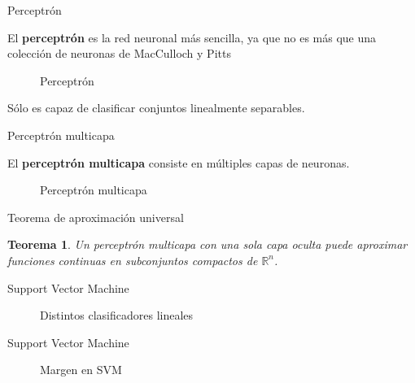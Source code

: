\documentclass[hyperref={unicode}]{beamer}
\newtheorem{teo}{\textbf{\color{ExecusharesBlue}Teorema}}
\begin{document}
\begin{frame}{Perceptrón}

El \textbf{perceptrón} es la red neuronal más sencilla, ya que no es más que una colección de neuronas de MacCulloch y Pitts

\begin{figure}[htbp!]
	\centering
	\resizebox{!}{0.35\textwidth}{\perceptron}
	\caption{Perceptrón}
\end{figure}

Sólo es capaz de clasificar conjuntos linealmente separables.
	
\end{frame}



\begin{frame}{Perceptrón multicapa}
 
El \textbf{perceptrón multicapa} consiste en múltiples capas de neuronas.

\begin{figure}[htbp!]
	\centering
	\resizebox{!}{0.4\textwidth}{\perceptronmulticapa}
	\caption{Perceptrón multicapa}
\end{figure}

\end{frame}


\begin{frame}{Teorema de aproximación universal}
 
\begin{teo}
Un perceptrón multicapa con una sola capa oculta puede aproximar funciones continuas en subconjuntos compactos de $\mathbb{R}^n$.
\end{teo}

\end{frame}



\begin{frame}{Support Vector Machine}
	\begin{figure}[htbp!]
		\centering
		\clasificador
		\caption{Distintos clasificadores lineales}
		\label{fig:clasificador}
	\end{figure}
\end{frame}



\begin{frame}{Support Vector Machine}
	\begin{figure}[htbp!]
		\centering
		\margen
	 	\caption{Margen en SVM}
	 	\label{fig:margen}
	 \end{figure}
\end{frame}
\end{document}
